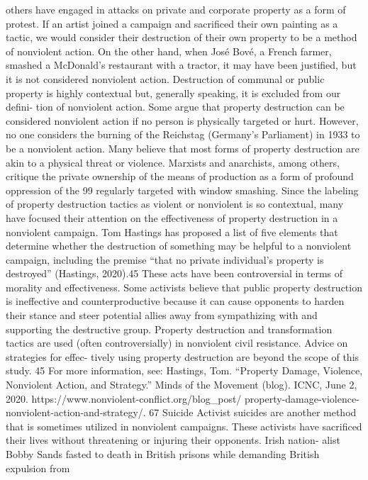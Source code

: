\documentclass[twoside,a4paper,12pt,fleqn,openany]{extbook}
\begin{document}
others have engaged in attacks on private and corporate property as a form of protest.
If an artist joined a campaign and sacrificed their own painting as a tactic, we would
consider their destruction of their own property to be a method of nonviolent action. On the
other hand, when José Bové, a French farmer, smashed a McDonald’s restaurant with a tractor,
it may have been justified, but it is not considered nonviolent action. Destruction of communal
or public property is highly contextual but, generally speaking, it is excluded from our defini-
tion of nonviolent action.
Some argue that property destruction can be considered nonviolent action if no person
is physically targeted or hurt. However, no one considers the burning of the Reichstag
(Germany’s Parliament) in 1933 to be a nonviolent action. Many believe that most forms of
property destruction are akin to a physical threat or violence. Marxists and anarchists, among
others, critique the private ownership of the means of production as a form of profound
oppression of the 99%
regularly targeted with window smashing.
Since the labeling of property destruction tactics as violent or nonviolent is so contextual,
many have focused their attention on the effectiveness of property destruction in a nonviolent
campaign. Tom Hastings has proposed a list of five elements that determine whether the
destruction of something may be helpful to a nonviolent campaign, including the premise
“that no private individual’s property is destroyed” (Hastings, 2020).45
These acts have been controversial in terms of morality and effectiveness. Some activists
believe that public property destruction is ineffective and counterproductive because it can
cause opponents to harden their stance and steer potential allies away from sympathizing
with and supporting the destructive group. Property destruction and transformation tactics
are used (often controversially) in nonviolent civil resistance. Advice on strategies for effec-
tively using property destruction are beyond the scope of this study.
45
For more information, see: Hastings, Tom. “Property Damage, Violence, Nonviolent Action, and Strategy.”
Minds of the Movement (blog). ICNC, June 2, 2020. https://www.nonviolent-conflict.org/blog_post/
property-damage-violence-nonviolent-action-and-strategy/.
67
Suicide
Activist suicides are another method that is sometimes utilized in nonviolent campaigns. These
activists have sacrificed their lives without threatening or injuring their opponents. Irish nation-
alist Bobby Sands fasted to death in British prisons while demanding British expulsion from
\end{document}
